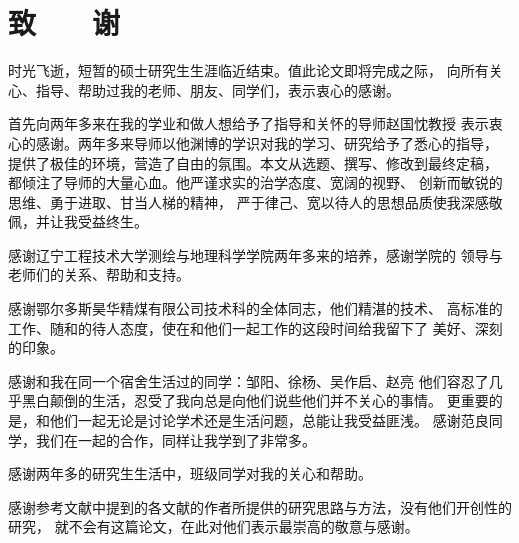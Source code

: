 ﻿%

%
%

\chapter*{\hfill \LARGE 致　　谢 \hfill}
\thispagestyle{plain}
时光飞逝，短暂的硕士研究生生涯临近结束。值此论文即将完成之际，
向所有关心、指导、帮助过我的老师、朋友、同学们，表示衷心的感谢。

首先向两年多来在我的学业和做人想给予了指导和关怀的导师赵国忱教授
表示衷心的感谢。两年多来导师以他渊博的学识对我的学习、研究给予了悉心的指导，
提供了极佳的环境，营造了自由的氛围。本文从选题、撰写、修改到最终定稿，
都倾注了导师的大量心血。他严谨求实的治学态度、宽阔的视野、
创新而敏锐的思维、勇于进取、甘当人梯的精神，
严于律己、宽以待人的思想品质使我深感敬佩，并让我受益终生。

感谢辽宁工程技术大学测绘与地理科学学院两年多来的培养，感谢学院的
领导与老师们的关系、帮助和支持。

感谢鄂尔多斯昊华精煤有限公司技术科的全体同志，他们精湛的技术、
高标准的工作、随和的待人态度，使在和他们一起工作的这段时间给我留下了
美好、深刻的印象。

感谢和我在同一个宿舍生活过的同学：邹阳、徐杨、吴作启、赵亮
他们容忍了几乎黑白颠倒的生活，忍受了我向总是向他们说些他们并不关心的事情。
更重要的是，和他们一起无论是讨论学术还是生活问题，总能让我受益匪浅。
感谢范良同学，我们在一起的合作，同样让我学到了非常多。

感谢两年多的研究生生活中，班级同学对我的关心和帮助。

感谢参考文献中提到的各文献的作者所提供的研究思路与方法，没有他们开创性的研究，
就不会有这篇论文，在此对他们表示最崇高的敬意与感谢。





